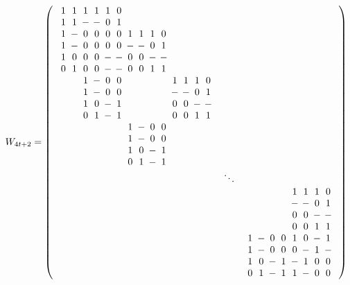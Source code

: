 $$W_{4t+2} =
\left(\begin{array}{lcl}
\Zp\Zp\Zp\Zp\Zp\Zz\Ze\Ze\Ze\Ze\Ze\Ze\Ze\Ze\\
\Zp\Zp\Zm\Zm\Zz\Zp\Ze\Ze\Ze\Ze\Ze\Ze\Ze\Ze\\
\Zp\Zm\Zz\Zz\Zz\Zz\Zp\Zp\Zp\Zz\Ze\Ze\Ze\Ze\\
\Zp\Zm\Zz\Zz\Zz\Zz\Zm\Zm\Zz\Zp\Ze\Ze\Ze\Ze\\
\Zp\Zz\Zz\Zz\Zm\Zm\Zz\Zz\Zm\Zm\Ze\Ze\Ze\Ze\\
\Zz\Zp\Zz\Zz\Zm\Zm\Zz\Zz\Zp\Zp\Ze\Ze\Ze\Ze\\
\Ze\Ze\Zp\Zm\Zz\Zz\Ze\Ze\Ze\Ze\Zp\Zp\Zp\Zz\\
\Ze\Ze\Zp\Zm\Zz\Zz\Ze\Ze\Ze\Ze\Zm\Zm\Zz\Zp\\
\Ze\Ze\Zp\Zz\Zm\Zp\Ze\Ze\Ze\Ze\Zz\Zz\Zm\Zm\\
\Ze\Ze\Zz\Zp\Zm\Zp\Ze\Ze\Ze\Ze\Zz\Zz\Zp\Zp\\
\Ze\Ze\Ze\Ze\Ze\Ze\Zp\Zm\Zz\Zz\Ze\Ze\Ze\Ze\\
\Ze\Ze\Ze\Ze\Ze\Ze\Zp\Zm\Zz\Zz\Ze\Ze\Ze\Ze\\
\Ze\Ze\Ze\Ze\Ze\Ze\Zp\Zz\Zm\Zp\Ze\Ze\Ze\Ze\\
\Ze\Ze\Ze\Ze\Ze\Ze\Zz\Zp\Zm\Zp\Ze\Ze\Ze\Ze\\
& \ddots & ~\\
&&\Ze\Ze\Ze\Ze\Zp\Zp\Zp\Zz\\
&&\Ze\Ze\Ze\Ze\Zm\Zm\Zz\Zp\\
&&\Ze\Ze\Ze\Ze\Zz\Zz\Zm\Zm\\
&&\Ze\Ze\Ze\Ze\Zz\Zz\Zp\Zp\\
&&\Zp\Zm\Zz\Zz\Zp\Zz\Zm\Zp\\
&&\Zp\Zm\Zz\Zz\Zz\Zm\Zp\Zm\\
&&\Zp\Zz\Zm\Zp\Zm\Zp\Zz\Zz\\
&&\Zz\Zp\Zm\Zp\Zp\Zm\Zz\Zz\\
\end{array}\right)
$$

